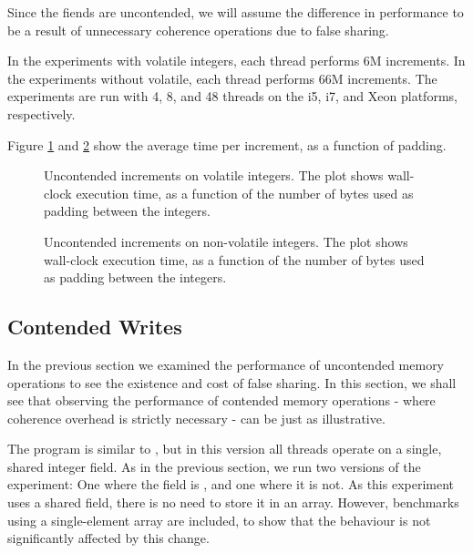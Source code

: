 Since the fiends are uncontended, we will assume the difference in performance
to be a result of unnecessary coherence operations due to false sharing.

In the experiments with volatile integers, each thread performs 6M increments.
In the experiments without volatile, each thread performs 66M increments. The
experiments are run with 4, 8, and 48 threads on the i5, i7, and Xeon platforms,
respectively.

Figure \ref{fig:uncont} and \ref{fig:uncont-nob} show the average time per
increment, as a function of padding.

\begin{figure}[hbpt]
\graphicspath{{plots/}}

\caption{Uncontended increments on volatile integers. The plot shows wall-clock
	execution time, as a function of the number of bytes used as padding
	between the integers.}
	\label{fig:uncont}
\end{figure}

\begin{figure}[hbpt]
\graphicspath{{plots/}}

\caption{Uncontended increments on non-volatile integers. The plot shows
	wall-clock execution time, as a function of the number of bytes used as padding
	between the integers.}
\label{fig:uncont-nob}
\end{figure}


\subsection{Contended Writes}

In the previous section we examined the performance of uncontended memory
operations to see the existence and cost of false sharing. In this section, we
shall see that observing the performance of contended memory operations - where
coherence overhead is strictly necessary - can be just as illustrative.


The program is similar to , but in this
version all threads operate on a single, shared integer field. As in the previous
section, we run two versions of the experiment: One where the field is
, and one where it is not. As this experiment uses a shared field,
there is no need to store it in an array. However, benchmarks using a
single-element array are included, to show that the behaviour is not
significantly affected by this change.

